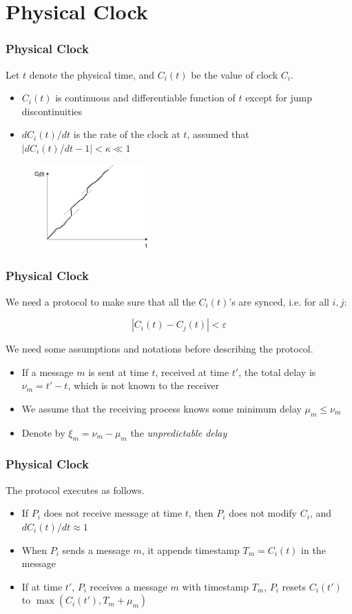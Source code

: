 \documentclass{beamer}
\begin{document}
\section{Physical Clock}
\frame
{
  \frametitle{Physical Clock}
  Let $t$ denote the physical time, and $C_i(t)$ be the value of clock $C_i$.

  \begin{itemize}
  	\item\pause $C_i(t)$ is continuous and differentiable function of $t$ except for jump discontinuities
  	\item\pause $dC_i(t)/dt$ is the rate of the clock at $t$, assumed that $\left|dC_i(t)/dt-1\right|<\kappa\ll 1$
  \end{itemize}

  \pause
  \begin{figure}[ht!]
  \includegraphics[width=0.4\textwidth]{files/ClockDist-Physical-Clock.png}
  \end{figure}

}

\frame
{
  \frametitle{Physical Clock}
  We need a protocol to make sure that all the $C_i(t)$'s are synced, i.e. for all $i,j$:

  \[|C_i(t)-C_j(t)|<\varepsilon\]

  \pause
  We need some assumptions and notations before describing the protocol.

  \begin{itemize}
  	\item\pause If a message $m$ is sent at time $t$, received at time $t'$, the total delay is $\nu_m=t'-t$, which is not known to the receiver
  	\item\pause We assume that the receiving process knows some minimum delay $\mu_m\leq\nu_m$
  	\item\pause Denote by $\xi_m=\nu_m-\mu_m$ the \emph{unpredictable delay}
  \end{itemize}
}

\frame
{
  \frametitle{Physical Clock}
  The protocol executes as follows.

  \begin{itemize}
  	\item<2-> If $P_i$ does not receive message at time $t$, then $P_i$ does not modify $C_i$, and $dC_i(t)/dt\approx 1$
  	\item<3-> When $P_i$ sends a message $m$, it appends timestamp $T_m=C_i(t)$ in the message
  	\item<4-> If at time $t'$, $P_i$ receives a message $m$ with timestamp $T_m$, $P_i$ resets $C_i(t')$ to $\max(C_i(t'), T_m+\mu_m)$
  \end{itemize}
}
\end{document}
